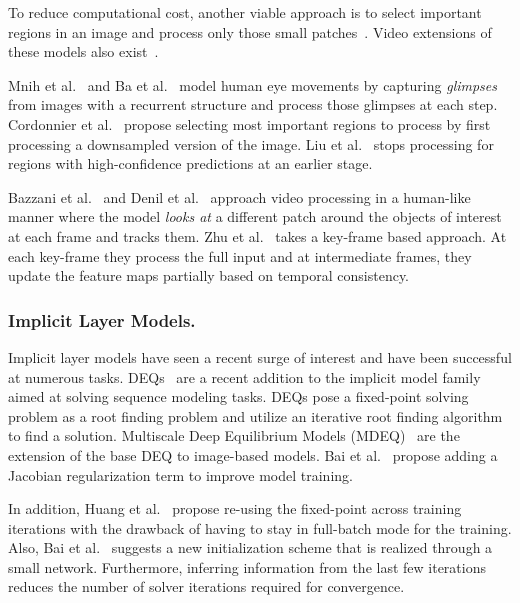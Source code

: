 \documentclass[runningheads]{llncs}
\begin{document}
To reduce computational cost, another viable approach is to select important regions in an image and process only those small patches~\cite{mnih2014ram,ba2015dram,cordonnier2021differentiable,liu2022confidence}. Video extensions of these models also exist~\cite{bazzani2011learning,denil2012learning,zhu2018towards}.


Mnih et al.~\cite{mnih2014ram} and Ba et al.~\cite{ba2015dram} model human eye movements by capturing {\em glimpses} from images with a recurrent structure and process those glimpses at each step. Cordonnier et al.~\cite{cordonnier2021differentiable} propose selecting most important regions to process by first processing a downsampled version of the image. Liu et al.~\cite{liu2022confidence} stops processing for regions with high-confidence predictions at an earlier stage.


Bazzani et al.~\cite{bazzani2011learning} and Denil et al.~\cite{denil2012learning} approach video processing in a human-like manner where the model {\em looks at} a different patch around the objects of interest at each frame and tracks them. Zhu et al.~\cite{zhu2018towards} takes a key-frame based approach. At each key-frame they process the full input and at intermediate frames, they update the feature maps partially based on temporal consistency.


\subsubsection{Implicit Layer Models.}


Implicit layer models have seen a recent surge of interest and have been successful at numerous tasks. DEQs~\cite{bai2019deq} are a recent addition to the implicit model family aimed at solving sequence modeling tasks. DEQs pose a fixed-point solving problem as a root finding problem and utilize an iterative root finding algorithm to find a solution. Multiscale Deep Equilibrium Models (MDEQ)~\cite{bai2020mdeq} are the extension of the base DEQ to image-based models. Bai et al.~\cite{bai2021stabilizing} propose adding a Jacobian regularization term to improve model training.


In addition, Huang et al.~\cite{huang2021impsq} propose re-using the fixed-point across training iterations with the drawback of having to stay in full-batch mode for the training. Also, Bai et al.~\cite{bai2021neural} suggests a new initialization scheme that is realized through a small network. Furthermore, inferring information from the last few iterations reduces the number of solver iterations required for convergence.
\end{document}
